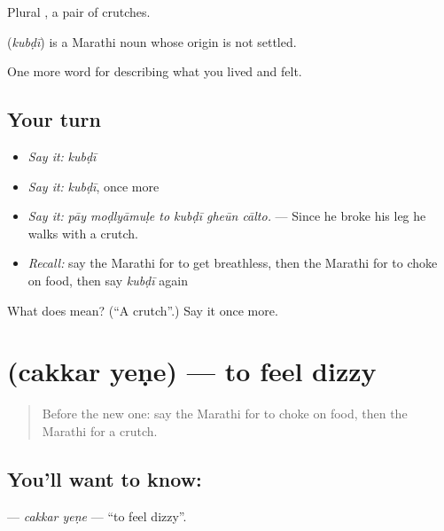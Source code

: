 Plural , a pair of crutches.

\begin{cousinweb}
\textbf{} (\emph{kubḍī}) is a Marathi noun whose origin is not settled.
\end{cousinweb}

\begin{grammarlens}[title={What you've built}]
One more word for describing what you lived and felt.
\end{grammarlens}

\subsection*{Your turn}
\begin{itemize}
\raggedright
  \item \emph{Say it:} \emph{kubḍī}
  \item \emph{Say it:} \emph{kubḍī}, once more
  \item \emph{Say it:} \emph{pāy moḍlyāmuḷe to kubḍī gheūn cālto.} — Since he broke his leg he walks with a crutch.
  \item \emph{Recall:} say the Marathi for to get breathless, then the Marathi for to choke on food, then say \emph{kubḍī} again
\end{itemize}

\begin{tcolorbox}[breakable,colback=teal!4,colframe=teal!35!black,title={Before you move on}]
What does  mean? (\textquotedblleft{}A crutch\textquotedblright{}.) Say it once more.
\end{tcolorbox}
\section[\texorpdfstring{\mr{चक्कर} \mr{येणे} (cakkar yeṇe)}{चक्कर येणे (cakkar yeṇe)}]{  (cakkar yeṇe) — to feel dizzy}

\label{lesson:MR-C493-cakkar-yene}



\begin{quote}
Before the new one: say the Marathi for to choke on food, then the Marathi for a crutch.
\end{quote}

\subsection*{You'll want to know:  }
\textbf{ } — \emph{cakkar yeṇe} — \textquotedblleft{}to feel dizzy\textquotedblright{}.

